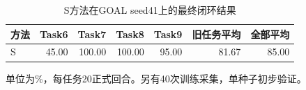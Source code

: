 \begin{table}[htbp]
\centering
\caption{S方法在GOAL seed41上的最终闭环结果}
\label{tab:preliminary-s41}
\begin{tabular}{lrrrrrr}
\toprule
方法 & Task6 & Task7 & Task8 & Task9 & 旧任务平均 & 全部平均 \\
\midrule
S & 45.00 & 100.00 & 100.00 & 95.00 & 81.67 & 85.00 \\
\bottomrule
\end{tabular}
\par\smallskip
{\footnotesize 单位为\%，每任务20正式回合。另有40次训练采集，单种子初步验证。}
\end{table}
